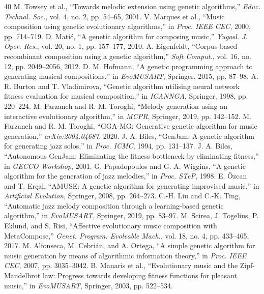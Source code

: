 \documentclass[conference,letterpaper]{IEEEtran}
\newcounter{algorithm}
\begin{document}
\begin{thebibliography}{40}
 M. Towsey et al., ``Towards melodic extension using genetic algorithms,'' \emph{Educ. Technol. Soc.}, vol. 4, no. 2, pp. 54--65, 2001.
 V. Marques et al., ``Music composition using genetic evolutionary algorithms,'' in \emph{Proc. IEEE CEC}, 2000, pp. 714--719.
 D. Mati{\'c}, ``A genetic algorithm for composing music,'' \emph{Yugosl. J. Oper. Res.}, vol. 20, no. 1, pp. 157--177, 2010.
 A. Eigenfeldt, ``Corpus-based recombinant composition using a genetic algorithm,'' \emph{Soft Comput.}, vol. 16, no. 12, pp. 2049--2056, 2012.
 D. M. Hofmann, ``A genetic programming approach to generating musical compositions,'' in \emph{EvoMUSART}, Springer, 2015, pp. 87--98.
 A. R. Burton and T. Vladimirova, ``Genetic algorithm utilising neural network fitness evaluation for musical composition,'' in \emph{ICANNGA}, Springer, 1998, pp. 220--224.
 M. Farzaneh and R. M. Toroghi, ``Melody generation using an interactive evolutionary algorithm,'' in \emph{MCPR}, Springer, 2019, pp. 142--152.
 M. Farzaneh and R. M. Toroghi, ``GGA-MG: Generative genetic algorithm for music generation,'' \emph{arXiv:2004.04687}, 2020.
 J. A. Biles, ``GenJam: A genetic algorithm for generating jazz solos,'' in \emph{Proc. ICMC}, 1994, pp. 131--137.
 J. A. Biles, ``Autonomous GenJam: Eliminating the fitness bottleneck by eliminating fitness,'' in \emph{GECCO Workshop}, 2001.
 G. Papadopoulos and G. A. Wiggins, ``A genetic algorithm for the generation of jazz melodies,'' in \emph{Proc. STeP}, 1998.
 E. {\"O}zcan and T. Er{\c{c}}al, ``AMUSE: A genetic algorithm for generating improvised music,'' in \emph{Artificial Evolution}, Springer, 2008, pp. 264--273.
 C.-H. Liu and C.-K. Ting, ``Automatic jazz melody composition through a learning-based genetic algorithm,'' in \emph{EvoMUSART}, Springer, 2019, pp. 83--97.
 M. Scirea, J. Togelius, P. Eklund, and S. Risi, ``Affective evolutionary music composition with MetaCompose,'' \emph{Genet. Program. Evolvable Mach.}, vol. 18, no. 4, pp. 433--465, 2017.
 M. Alfonseca, M. Cebri{\'a}n, and A. Ortega, ``A simple genetic algorithm for music generation by means of algorithmic information theory,'' in \emph{Proc. IEEE CEC}, 2007, pp. 3035--3042.
 B. Manaris et al., ``Evolutionary music and the Zipf-Mandelbrot law: Progress towards developing fitness functions for pleasant music,'' in \emph{EvoMUSART}, Springer, 2003, pp. 522--534.

\end{thebibliography}
\end{document}
